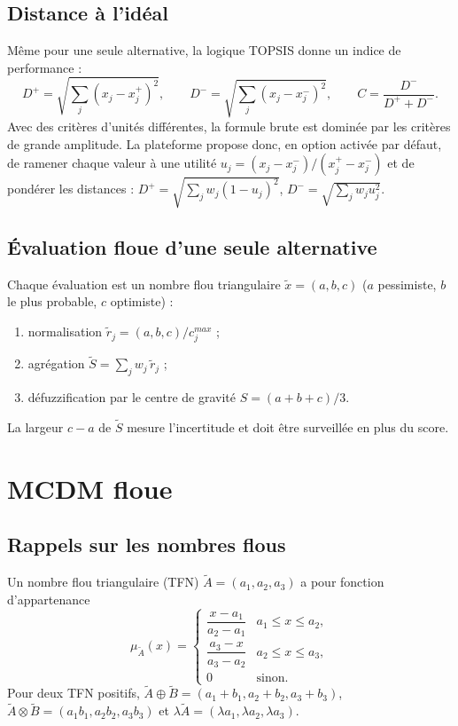 \documentclass[11pt,a4paper]{report}
\theoremstyle{definition}
\theoremstyle{remark}
\begin{document}
\section{Distance à l'idéal}
Même pour une seule alternative, la logique TOPSIS donne un indice de performance :
\begin{equation}
  D^+=\sqrt{\sum_j (x_j-x_j^+)^2},\qquad D^-=\sqrt{\sum_j (x_j-x_j^-)^2},\qquad C=\frac{D^-}{D^++D^-}.
\end{equation}
Avec des critères d'unités différentes, la formule brute est dominée par les critères de grande amplitude.
La plateforme propose donc, en option activée par défaut, de ramener chaque valeur à une utilité
$u_j=(x_j-x_j^-)/(x_j^+-x_j^-)$ et de pondérer les distances : $D^+=\sqrt{\sum_j w_j(1-u_j)^2}$,
$D^-=\sqrt{\sum_j w_j u_j^2}$.

\section{Évaluation floue d'une seule alternative}
Chaque évaluation est un nombre flou triangulaire $\tilde x=(a,b,c)$ ($a$ pessimiste, $b$ le plus probable,
$c$ optimiste) :
\begin{enumerate}
  \item normalisation $\tilde r_j=(a,b,c)/c_j^{max}$ ;
  \item agrégation $\tilde S=\sum_j w_j\,\tilde r_j$ ;
  \item défuzzification par le centre de gravité $S=(a+b+c)/3$.
\end{enumerate}
La largeur $c-a$ de $\tilde S$ mesure l'incertitude et doit être surveillée en plus du score.

\chapter{MCDM floue}\label{ch:floue}

\section{Rappels sur les nombres flous}

Un nombre flou triangulaire (TFN) $\tilde A=(a_1,a_2,a_3)$ a pour fonction d'appartenance
\begin{equation}
  \mu_{\tilde A}(x)=
  \begin{cases}
    \dfrac{x-a_1}{a_2-a_1} & a_1\le x\le a_2,\\[6pt]
    \dfrac{a_3-x}{a_3-a_2} & a_2\le x\le a_3,\\[4pt]
    0 & \text{sinon.}
  \end{cases}
\end{equation}
Pour deux TFN positifs, $\tilde A\oplus\tilde B=(a_1+b_1,a_2+b_2,a_3+b_3)$,
$\tilde A\otimes\tilde B=(a_1b_1,a_2b_2,a_3b_3)$ et $\lambda\tilde A=(\lambda a_1,\lambda a_2,\lambda a_3)$.
\end{document}
